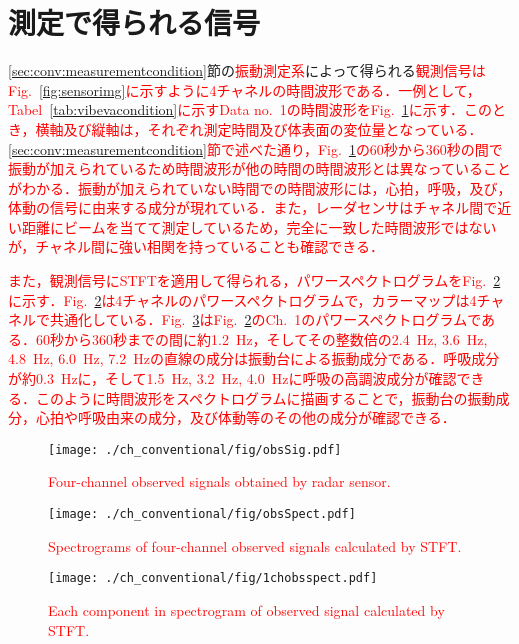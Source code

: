 \section{測定で得られる信号}
\label{sec:conv:signal}
\ref{sec:conv:measurementcondition}節の\textcolor{red}{振動測定系}によって得られる\textcolor{red}{観測信号はFig.~\ref{fig:sensorimg}に示すように4チャネルの時間波形である．一例として，Tabel~\ref{tab:vibevacondition}に示すData no.~1の時間波形をFig.~\ref{fig:obssig}に示す．このとき，横軸及び縦軸は，それぞれ測定時間及び体表面の変位量となっている．\ref{sec:conv:measurementcondition}節で述べた通り，Fig.~\ref{fig:obssig}の60秒から360秒の間で振動が加えられているため時間波形が他の時間の時間波形とは異なっていることがわかる．振動が加えられていない時間での時間波形には，心拍，呼吸，及び，体動の信号に由来する成分が現れている．また，レーダセンサはチャネル間で近い距離にビームを当てて測定しているため，完全に一致した時間波形ではないが，チャネル間に強い相関を持っていることも確認できる．}

\textcolor{red}{また，観測信号にSTFTを適用して得られる，パワースペクトログラムをFig.~\ref{fig:4chobsspect}に示す．Fig.~\ref{fig:4chobsspect}は4チャネルのパワースペクトログラムで，カラーマップは4チャネルで共通化している．Fig.~\ref{fig:1chobsspect}はFig.~\ref{fig:4chobsspect}のCh.~1のパワースペクトログラムである．60秒から360秒までの間に約1.2~Hz，そしてその整数倍の2.4~Hz, 3.6~Hz, 4.8~Hz, 6.0~Hz, 7.2~Hzの直線の成分は振動台による振動成分である．呼吸成分が約0.3~Hzに，そして1.5~Hz, 3.2~Hz, 4.0~Hzに呼吸の高調波成分が確認できる．このように時間波形をスペクトログラムに描画することで，振動台の振動成分，心拍や呼吸由来の成分，及び体動等のその他の成分が確認できる．}

\begin{figure}[b]
\centering
\texttt{[image: ./ch\_conventional/fig/obsSig.pdf]}
\caption{\textcolor{red}{Four-channel observed signals obtained by radar sensor.}}
\label{fig:obssig}
\end{figure}

\begin{figure}[tb]
\centering
\texttt{[image: ./ch\_conventional/fig/obsSpect.pdf]}
\caption{\textcolor{red}{Spectrograms of four-channel observed signals calculated by STFT.}}
\label{fig:4chobsspect}
\end{figure}

\begin{figure}[tb]
\centering
\texttt{[image: ./ch\_conventional/fig/1chobsspect.pdf]}
\caption{\textcolor{red}{Each component in spectrogram of observed signal calculated by STFT.}}
\label{fig:1chobsspect}
\end{figure}

